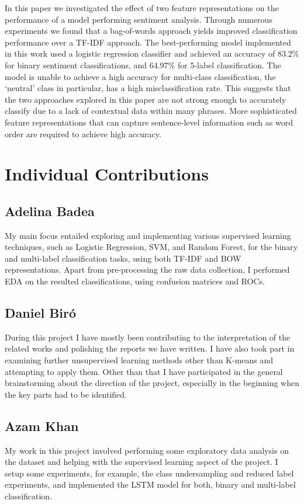 \documentclass{article}
\begin{document}
In this paper we investigated the effect of two feature representations on the performance of a model performing sentiment analysis. Through numerous experiments we found that a bag-of-words approach yields improved classification performance over a TF-IDF approach. The best-performing model implemented in this work used a logistic regression classifier and achieved an accuracy of 83.2\% for binary sentiment classifications, and 64.97\% for 5-label classification. The model is unable to achieve a high accuracy for multi-class classification, the `neutral' class in particular, has a high misclassification rate. This suggests that the two approaches explored in this paper are not strong enough to accurately classify due to a lack of contextual data within many phrases. More sophisticated feature representations that can capture sentence-level information such as word order are required to achieve high accuracy.


\section{Individual Contributions}

\subsection{Adelina Badea}

My main focus entailed exploring and implementing various supervised learning techniques, such as Logistic Regression, SVM, and Random Forest, for the binary and multi-label classification tasks, using both TF-IDF and BOW representations. Apart from pre-processing the raw data collection, I performed EDA on the resulted classifications, using confusion matrices and ROCs. 

\subsection{Daniel Biró}

During this project I have mostly been contributing to the interpretation of the related works and polishing the reports we have written. I have also took part in examining further unsupervised learning methods other than K-means and attempting to apply them. Other than that I have participated in the general brainstorming about the direction of the project, especially in the beginning when the key parts had to be identified.

\subsection{Azam Khan}
My work in this project involved performing some exploratory data analysis on the dataset and helping with the supervised learning aspect of the project. I setup some experiments, for example, the class undersampling and reduced label experiments, and implemented the LSTM model for both, binary and multi-label classification.
\end{document}
